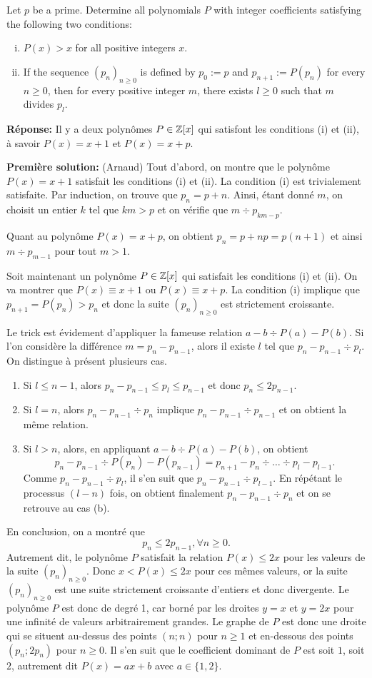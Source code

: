 Let $p$ be a prime. Determine all polynomials $P$ with integer coefficients satisfying the following two conditions:
\begin{enumerate}[(i)]
    \item $P(x)>x$ for all positive integers $x$.
    \item If the sequence $(p_n)_{n\geq 0}$ is defined by $p_0:=p$ and $p_{n+1}:=P(p_n)$ for every $n\geq 0$, then for every positive integer $m$, there exists $l\geq 0$ such that $m$ divides $p_l$. 
\end{enumerate}

\textbf{Réponse:} Il y a deux polynômes $P\in \mathbb{Z}[x]$ qui satisfont les conditions (i) et (ii), à savoir $P(x)=x+1$ et $P(x) = x + p$.

\textbf{Première solution:} (Arnaud) Tout d'abord, on montre que le polynôme $P(x)=x+1$ satisfait les conditions (i) et (ii). La condition (i) est trivialement satisfaite. Par induction, on trouve que $p_n=p+n$. Ainsi, étant donné $m$, on choisit un entier $k$ tel que $km>p$ et on vérifie que $m\div p_{km-p}$.

Quant au polynôme $P(x)=x+p$, on obtient $p_n=p+np=p(n+1)$ et ainsi $m\div p_{m-1}$ pour tout $m>1$.

Soit maintenant un polynôme $P\in\mathbb{Z}[x]$ qui satisfait les conditions (i) et (ii). On va montrer que $P(x)\equiv x+1$ ou $P(x)\equiv x+p$. La condition (i) implique que $p_{n+1}=P(p_n)>p_n$ et donc la suite $(p_n)_{n\geq 0}$ est strictement croissante.

Le trick est évidement d'appliquer la fameuse relation $a-b\div P(a)-P(b)$. Si l'on considère la différence $m=p_n-p_{n-1}$, alors il existe $l$ tel que $p_n-p_{n-1}\div p_l$. On distingue à présent plusieurs cas.
\begin{enumerate}
    \item Si $l\leq n-1$, alors $p_n-p_{n-1}\leq p_l\leq p_{n-1}$ et donc $p_n\leq 2p_{n-1}$.
    \item Si $l=n$, alors $p_n-p_{n-1}\div p_n$ implique $p_n-p_{n-1}\div p_{n-1}$ et on obtient la même relation.
    \item Si $l>n$, alors, en appliquant $a-b\div P(a)-P(b)$, on obtient
    \[
    p_n-p_{n-1}\div P(p_n)-P(p_{n-1})=p_{n+1}-p_n\div \ldots \div p_l-p_{l-1}.
    \]
    Comme $p_n-p_{n-1}\div p_l$, il s'en suit que $p_n-p_{n-1}\div p_{l-1}$. En répétant le processus $(l-n)$ fois, on obtient finalement $p_n-p_{n-1}\div p_n$ et on se retrouve au cas (b).
\end{enumerate}
En conclusion, on a montré que 
\[
p_n\leq 2p_{n-1}, \forall n\geq 0.
\]
Autrement dit, le polynôme $P$ satisfait la relation $P(x)\leq 2x$ pour les valeurs de la suite $(p_n)_{n\geq 0}$. Donc $x<P(x)\leq 2x$ pour ces mêmes valeurs, or la suite $(p_n)_{n\geq 0}$ est une suite strictement croissante d'entiers et donc divergente. Le polynôme $P$ est donc de degré 1, car borné par les droites $y=x$ et $y=2x$ pour une infinité de valeurs arbitrairement grandes. Le graphe de $P$ est donc une droite qui se situent au-dessus des points $(n;n)$ pour $n\geq 1$ et en-dessous des points $(p_n;2p_n)$ pour $n\geq 0$. Il s'en suit que le coefficient dominant de $P$ est soit $1$, soit $2$, autrement dit $P(x)=ax+b$ avec $a\in\{1,2\}$. 

